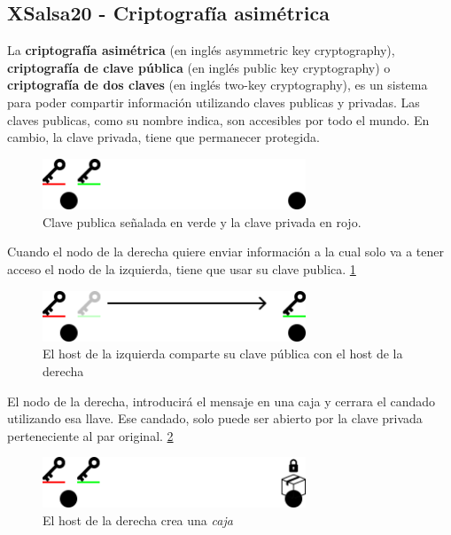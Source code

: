 \subsection{XSalsa20 - Criptografía asimétrica}
La \textbf{criptografía asimétrica} (en inglés asymmetric key cryptography), \textbf{criptografía de clave pública} (en inglés public key cryptography) o \textbf{criptografía de dos claves} (en inglés two-key cryptography), es un sistema para poder compartir información utilizando claves publicas y privadas. Las claves publicas, como su nombre indica, son accesibles por todo el mundo. En cambio, la clave privada, tiene que permanecer protegida. \cite{web:asimetrica}
\begin{figure}[h!]
    \centering
    \includegraphics[width=0.7\textwidth]{Figures/Claves.png}
    \caption{Clave publica señalada en verde y la clave privada en rojo.}
    \label{fg:clave}
\end{figure}
Cuando el nodo de la derecha quiere enviar información a la cual solo va a tener acceso el nodo de la izquierda, tiene que usar su clave publica. \ref{fg:clave}
\begin{figure}[h!]
    \centering
    \includegraphics[width=0.7\textwidth]{Figures/Claves en movimiento(1).png}
    \caption{El host de la izquierda comparte su clave pública con el host de la derecha}
    \label{fg:movimiento}
\end{figure}
El nodo de la derecha, introducirá el mensaje en una caja y cerrara el candado utilizando esa llave. Ese candado, solo puede ser abierto por la clave privada perteneciente al par original. \ref{fg:movimiento}
\begin{figure}[h!]
    \centering
    \includegraphics[width=0.7\textwidth]{Figures/Caja.png}
    \caption{El host de la derecha crea una \textit{caja}}
\end{figure}
